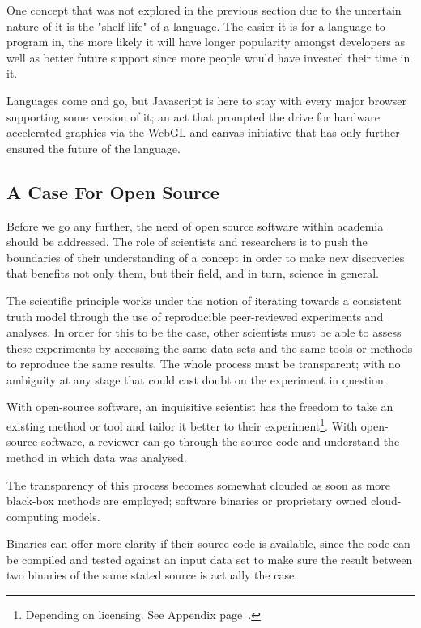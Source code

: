 One concept that was not explored in the previous section due to the uncertain nature of it is the "shelf life" of a language. The easier it is for a language to program in, the more likely it will have longer popularity amongst  developers as well as better future support since more people would have invested their time in it. 

Languages come and go, but Javascript is here to stay with every major browser supporting some version of it; an act that prompted the drive for hardware accelerated graphics via the WebGL and canvas initiative that has only further ensured the future of the language.


\subsection{A Case For Open Source}


Before we go any further, the need of open source software within academia should be addressed. The role of scientists and researchers is to push the boundaries of their understanding of a concept in order to make new discoveries that benefits not only them, but their field, and in turn, science in general. 

The scientific principle works under the notion of iterating towards a consistent truth model through the use of reproducible peer-reviewed experiments and analyses.  In order for this to be the case, other scientists must be able to assess these experiments by accessing the same data sets and the same tools or methods to reproduce the same results. The whole process must be transparent; with no ambiguity at any stage that could cast doubt on the experiment in question.

With open-source software, an inquisitive scientist has the freedom to take an existing method or tool and tailor it better to their experiment\footnote{Depending on licensing. See Appendix page~\pageref{ref:app:licensing}.}. With open-source software, a reviewer can go through the source code and understand the method in which data was analysed.

The transparency of this process becomes somewhat clouded as soon as more black-box methods are employed; software binaries or proprietary owned cloud-computing models.

Binaries can offer more clarity if their source code is available, since the code can be compiled and tested against an input data set to make sure the result between two binaries of the same stated source is actually the case.

